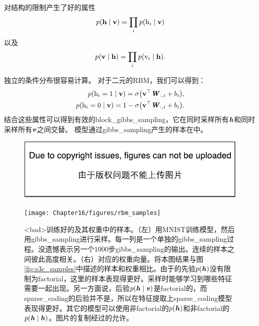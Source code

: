 对结构的限制产生了好的属性
\begin{align}
\label{eqn:1611}
p(\mathbf{h}\mid\mathbf{v}) = \prod_i p(\mathrm{h}_i\mid \mathbf{v})
\end{align}
以及
\begin{align}
\label{eqn:1612}
p(\mathbf{v}\mid\mathbf{h}) = \prod_i p(\mathrm{v}_i\mid \mathbf{h}).
\end{align}


独立的条件分布很容易计算。
对于二元的\gls{RBM}，我们可以得到：
\begin{align}
\label{eqn:1613}
\begin{aligned}
p(\mathrm{h}_i = 1\mid\mathbf{v}) = \sigma\big(\mathbf{v}^{\top}\boldsymbol{\mathit{W}}_{:,i} + b_i\big),\\
p(\mathrm{h}_i = 0\mid\mathbf{v}) = 1 - \sigma\big(\mathbf{v}^{\top}\boldsymbol{\mathit{W}}_{:,i} + b_i\big).\\
\end{aligned}
\end{align}
结合这些属性可以得到有效的\gls{block_gibbs_sampling}，它在同时采样所有$\boldsymbol{\mathit{h}}$和同时采样所有$\boldsymbol{\mathit{v}}$之间交替。
模型通过\gls{gibbs_sampling}产生的样本在中。

\begin{figure}[!htb]
\ifOpenSource
\centerline{\includegraphics{figure.pdf}}
\else
	\centerline{\texttt{[image: Chapter16/figures/rbm\_samples]}}	
\fi
	\caption{<bad>训练好的及其权重中的样本。（左）用MNIST训练模型，然后用\gls{gibbs_sampling}进行采样。每一列是一个单独的\gls{gibbs_sampling}过程。没遗憾表示另一个$1000$步\gls{gibbs_sampling}的输出。连续的样本之间彼此高度相关。（右）对应的权重向量。将本图结果与图\ref{fig:s3c_samples}中描述的样本和权重相比。由于的先验$p(\boldsymbol{\mathit{h}})$没有限制为\gls{factorial}，这里的样本表现得更好。采样时能够学习到哪些特征需要一起出现。另一方面说，后验$p(\boldsymbol{\mathit{h}} \mid \boldsymbol{\mathit{v}})$是\gls{factorial}的，而\gls{sparse_coding}的后验并不是，所以在特征提取上\gls{sparse_coding}模型表现得更好。其它的模型可以使用非\gls{factorial}的$p(\boldsymbol{\mathit{h}})$和非\gls{factorial}的$p(\boldsymbol{\mathit{h}} \mid \boldsymbol{\mathit{h}})$。图片的复制经过\citet{lisa_tutorial_rbm}的允许。}
	\label{fig:rbm_sample}
\end{figure}


